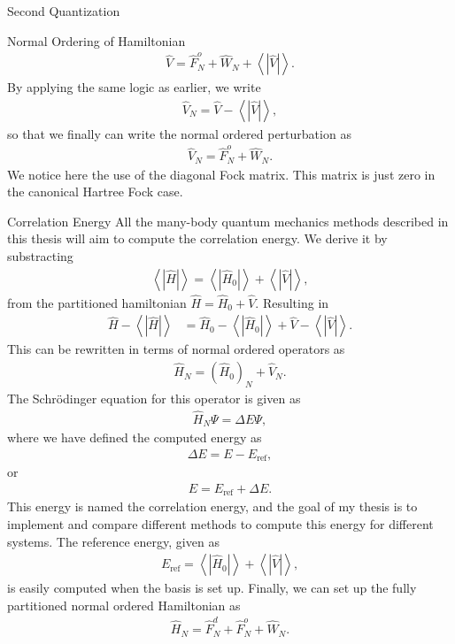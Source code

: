 \documentclass[twoside,english]{uiofysmaster}
\begin{document}
\begin{chapter}{Second Quantization}
\begin{section}{Normal Ordering of Hamiltonian}
		\begin{align}
			\hat V = \hat F_N^o + \hat W_N + \left< \right. | \hat V | \left. \right>.
		\end{align}
		By applying the same logic as earlier, we write
		\begin{align}
			\hat V_N = \hat V - \left< \right. | \hat V | \left. \right>,
		\end{align}
		so that we finally can write the normal ordered perturbation as
		\begin{align}
			\hat V_N = \hat F_N^o + \hat W_N.
		\end{align}
		We notice here the use of the diagonal Fock matrix. This matrix is just zero in the canonical Hartree Fock case. 
	\end{section}

	\begin{section}{Correlation Energy}
		All the many-body quantum mechanics methods described in this thesis will aim to compute the correlation energy. We derive it by substracting 
		\begin{align}
			\left< \right. | \hat H | \left. \right> = \left< \right. | \hat H_0 | \left. \right> + \left< \right. | \hat V | \left. \right>,
		\end{align}
		from the partitioned hamiltonian $\hat H = \hat H_0 + \hat V$. Resulting in
		\begin{align}
			\hat H - \left< \right. | \hat H | \left. \right> &= \hat H_0 - \left< \right. | \hat H_0 | \left. \right> + \hat V - \left< \right. |\hat V| \left. \right>.
		\end{align}
		This can be rewritten in terms of normal ordered operators as 
		\begin{align}
			\hat H_N = (\hat H_0)_N + \hat V_N.
			\label{equation:normalorderHamiltonian}
		\end{align}
		The Schr\"{o}dinger equation for this operator is given as
		\begin{align}
			\hat H_N \Psi = \Delta E \Psi ,
		\end{align}
		where we have defined the computed energy as
		\begin{align}
			\Delta E = E - E_{\text{ref}},
		\end{align}
		or 
		\begin{align}
			E = E_{\text{ref}} + \Delta E.
		\end{align}
		This energy is named the correlation energy, and the goal of my thesis is to implement and compare different methods to compute this energy for different systems. The reference energy, given as
		\begin{align}
			E_{\text{ref}} = \left< \right. | \hat H_0 | \left. \right> + \left< \right. | \hat V | \left. \right>,
		\end{align}
		is easily computed when the basis is set up. Finally, we can set up the fully partitioned normal ordered Hamiltonian as
		\begin{align}
			\hat H_N = \hat F_N^d + \hat F_N^o + \hat W_N.
		\end{align}


\end{section}
\end{chapter}
\end{document}
